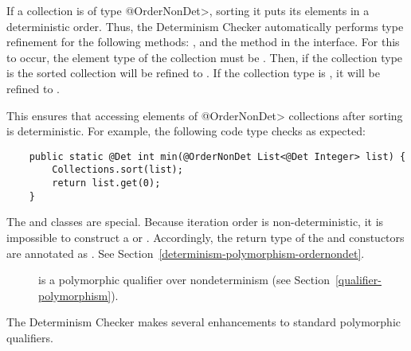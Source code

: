 If a collection is of type \<@OrderNonDet>, sorting it puts
its elements in a deterministic order. Thus, the Determinism Checker automatically
performs type refinement for the following methods: ,
 and the  method in the  interface.
For this to occur, the element type of the collection must be . Then,
if the collection type is  the sorted collection will be
refined to . If the collection type is , it will be
refined to .

This ensures that accessing elements of \<@OrderNonDet> collections after sorting
is deterministic.
For example, the following code type checks as expected:

\begin{Verbatim}
    public static @Det int min(@OrderNonDet List<@Det Integer> list) {
        Collections.sort(list);
        return list.get(0);
    }
\end{Verbatim}

The  and  classes are special. Because iteration order is
non-deterministic, it is impossible to construct a 
or .
Accordingly, the return type of the  and 
constuctors are annotated as . See
Section~\ref{determinism-polymorphism-ordernondet}.


\begin{description}
\item[] is a
  polymorphic qualifier over nondeterminism (see Section~\ref{qualifier-polymorphism}).
\end{description}

The Determinism Checker makes
several enhancements to standard polymorphic qualifiers.



